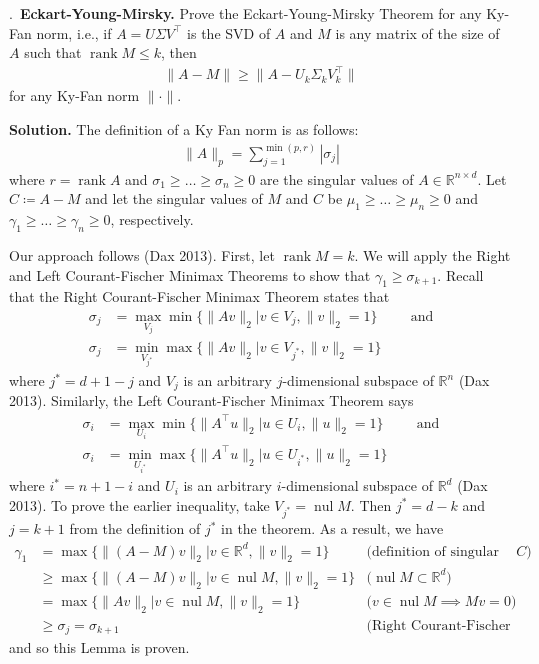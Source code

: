\documentclass{letter}
\newcounter{problem}
\newcommand{\Problem}[2]{%
	\stepcounter{problem}%
	\leftskip=0pt%
	\theproblem.~\textbf{{#1.}} #2 \par%
}
\newcommand{\Solution}[1]{%
	\textbf{Solution.} #1 \par%
}
\newcommand{\T}{\intercal}
\newcommand{\R}{\mathbb{R}}
\DeclareMathOperator{\rank}{rank}
\DeclareMathOperator{\nul}{nul}
\begin{document}
    \Problem{Eckart-Young-Mirsky}{Prove the Eckart-Young-Mirsky Theorem for any Ky-Fan norm, i.e., if $A = U\Sigma V^\T$ is the SVD of $A$ and $M$ is any matrix of the size of $A$ such that $\rank M \leq k$, then \begin{align*}
        \|A - M\| \geq \|A - U_k\Sigma_kV_k^\T\|
    \end{align*} for any Ky-Fan norm $\|\cdot \|$.}
    \Solution{The definition of a Ky Fan norm is as follows: \begin{align*}
        \|A\|_p = \sum_{j=1}^{\min(p, r)} |\sigma_j|
    \end{align*} where $r = \rank A$ and $\sigma_1 \geq \dots \geq \sigma_n \geq 0$ are the singular values of $A \in \R^{n\times d}$. Let $C \coloneqq A - M$ and let the singular values of $M$ and $C$ be $\mu_1 \geq \dots \geq \mu_n \geq 0$ and $\gamma_1 \geq \dots \geq \gamma_n \geq 0$, respectively. 

    Our approach follows (Dax 2013). First, let $\rank M = k$. We will apply the Right and Left Courant-Fischer Minimax Theorems to show that $\gamma_1 \geq \sigma_{k+1}$. Recall that the Right Courant-Fischer Minimax Theorem states that \begin{align*}
        \sigma_j &= \max_{V_j}\min \{\|Av\|_2 | v \in V_j, \|v\|_2 = 1\} \hspace{1cm} \text{and}\\
        \sigma_j &= \min_{V_{j^*}}\max \{\|Av\|_2 | v \in V_{j^*}, \|v\|_2 = 1\}
    \end{align*} where $j^* = d + 1 - j$ and $V_j$ is an arbitrary $j$-dimensional subspace of $\R^n$ (Dax 2013). Similarly, the Left Courant-Fischer Minimax Theorem says \begin{align*}
        \sigma_i &= \max_{U_i}\min \{\|A^\T u\|_2 | u \in U_i, \|u\|_2 = 1\} \hspace{1cm} \text{and}\\
        \sigma_i &= \min_{U_{i^*}}\max \{\|A^\T u\|_2 | u \in U_{i^*}, \|u\|_2 = 1\}
    \end{align*} where $i^* = n + 1 - i$ and $U_i$ is an arbitrary $i$-dimensional subspace of $\R^d$ (Dax 2013). To prove the earlier inequality, take $V_{j^*} = \nul M$. Then $j^* = d - k$ and $j = k + 1$ from the definition of $j^*$ in the theorem. As a result, we have \begin{align*}
        \gamma_1 &= \max \{\|(A - M)v\|_2 | v \in \R^d, \|v\|_2 = 1\} &\text{(definition of singular values of $C$)} \\
        &\geq \max\{\|(A - M)v\|_2 | v \in \nul M, \|v\|_2 = 1\} &\text{($\nul M \subset \R^d$)} \\
        &= \max\{\|Av\|_2 | v \in \nul M, \|v\|_2 = 1\} &\text{($v \in \nul M \implies Mv = 0$)} \\
        &\geq \sigma_j = \sigma_{k+1} &\text{(Right Courant-Fischer Minimax Theorem)}
    \end{align*} and so this Lemma is proven.
    
}
\end{document}
